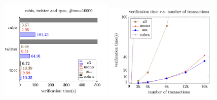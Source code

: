 
\begin{frame}{}
	\begin{figure}[H]
		\centering
		\includegraphics[width=0.48\textwidth]{figs/ser-checker-rubis-twitter-and-tpcc-ntxn10000.png}
		\includegraphics[width=0.48\textwidth]{figs/ser-checker-chengRW-verification-time-vs-ntxns.png}
	\end{figure}
\end{frame}

